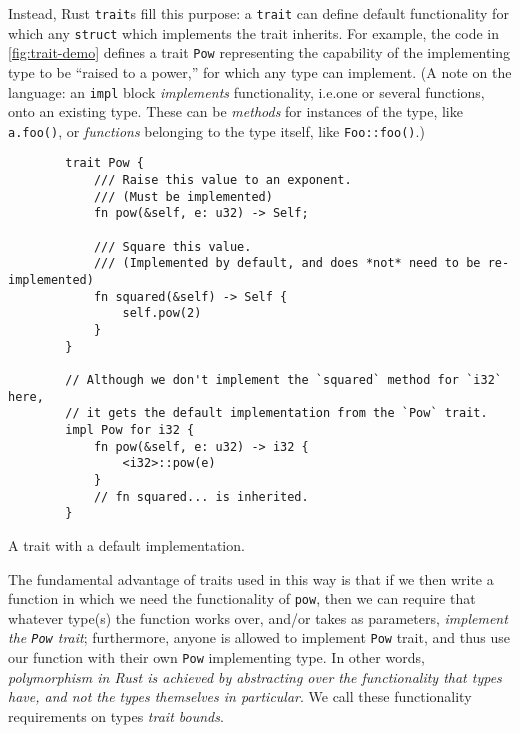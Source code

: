 \documentclass{report}
\newenvironment{code}{\captionsetup{type=listing}}{}
\begin{document}
Instead, Rust \Verb+trait+s fill this purpose: a \Verb+trait+ can define default
functionality for which any \Verb+struct+ which implements the trait inherits.
For example, the code in \cref{fig:trait-demo} defines a trait \Verb+Pow+
representing the capability of the implementing type to be ``raised to a
power,'' for which any type can implement. (A note on the language: an
\Verb+impl+ block \emph{implements} functionality, i.e.\@ one or several
functions, onto an existing type. These can be \emph{methods} for instances of
the type, like \Verb+a.foo()+, or \emph{functions} belonging to the type itself,
like \Verb+Foo::foo()+.)
\begin{code}
    \begin{verbatim}
        trait Pow {
            /// Raise this value to an exponent.
            /// (Must be implemented)
            fn pow(&self, e: u32) -> Self;

            /// Square this value.
            /// (Implemented by default, and does *not* need to be re-implemented)
            fn squared(&self) -> Self {
                self.pow(2)
            }
        }

        // Although we don't implement the `squared` method for `i32` here,
        // it gets the default implementation from the `Pow` trait.
        impl Pow for i32 {
            fn pow(&self, e: u32) -> i32 {
                <i32>::pow(e)
            }
            // fn squared... is inherited.
        }
    \end{verbatim}
    \caption{A trait with a default implementation.}
    \label{fig:trait-demo}
\end{code}
\noindent
The fundamental advantage of traits used in this way is that if we then write a
function in which we need the functionality of \Verb+pow+, then we can require
that whatever type(s) the function works over, and/or takes as parameters,
\emph{implement the \Verb+Pow+ trait}; furthermore, anyone is allowed to
implement \Verb+Pow+ trait, and thus use our function with their own \Verb+Pow+
implementing type. In other words, \emph{polymorphism in Rust is achieved by
abstracting over the functionality that types have, and not the types
themselves in particular}. We call these functionality requirements on types
\emph{trait bounds}.
\end{document}
